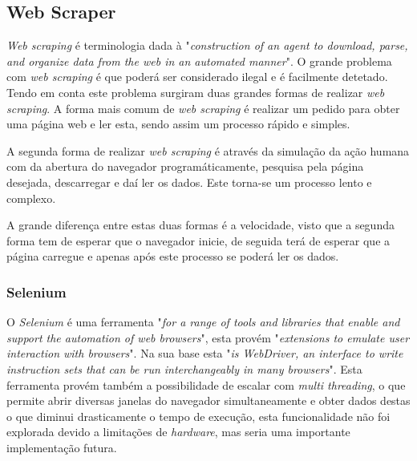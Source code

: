 \subsection{Web Scraper}
\textit{Web scraping} é terminologia dada à "\emph{construction of an agent to download, parse, and organize data from the web in an automated manner}"\citep{web_scraping}. O grande problema com \textit{web scraping} é que poderá ser considerado ilegal e é facilmente detetado. Tendo em conta este problema surgiram duas grandes formas de realizar \textit{web scraping}. A forma mais comum de \textit{web scraping} é realizar um pedido para obter uma página web e ler esta, sendo assim um processo rápido e simples.

A segunda forma de realizar \textit{web scraping} é através da simulação da ação humana com da abertura do navegador programáticamente, pesquisa pela página desejada, descarregar e daí ler os dados. Este torna-se um processo lento e complexo. 

A grande diferença entre estas duas formas é a velocidade, visto que a segunda forma tem de esperar que o navegador inicie, de seguida terá de esperar que a página carregue e apenas após este processo se poderá ler os dados.

\subsubsection{Selenium}

O \emph{Selenium} é uma ferramenta "\emph{for a range of tools and libraries that enable and support the automation of web browsers}"\citep{selenium}, esta provém "\emph{extensions to emulate user interaction with browsers}"\citep{selenium}. Na sua base esta "\emph{is WebDriver, an interface to write instruction sets that can be run interchangeably in many browsers}"\citep{selenium}. Esta ferramenta provém também a possibilidade de escalar com \textit{multi threading}, o que permite abrir diversas janelas do navegador simultaneamente e obter dados destas o que diminui drasticamente o tempo de execução, esta funcionalidade não foi explorada devido a limitações de \textit{hardware}, mas seria uma importante implementação futura.